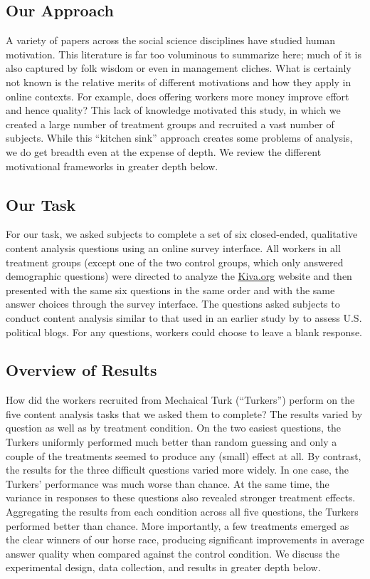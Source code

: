 \documentclass{chi2009}
\begin{document}
\subsection{Our Approach} 
A variety of papers across the social science disciplines have studied
human motivation. This literature is far too voluminous to summarize
here; much of it is also captured by folk wisdom or even in management
cliches. What is certainly not known is the relative merits of
different motivations and how they apply in online contexts. For
example, does offering workers more money improve effort and hence
quality? This lack of knowledge motivated this study, in which we
created a large number of treatment groups and recruited a vast number
of subjects. While this ``kitchen sink'' approach creates some
problems of analysis, we do get breadth even at the expense of
depth. We review the different motivational frameworks in greater
depth below.

\subsection{Our Task} 
For our task, we asked subjects to complete a set of six closed-ended,
qualitative content analysis questions using an online survey
interface. All workers in all treatment groups (except one of the two
control groups, which only answered demographic questions) were
directed to analyze the \href{http://www.kiva.org}{Kiva.org} website and then presented with the same
six questions in the same order and with the same answer choices
through the survey interface. The questions asked subjects to conduct
content analysis similar to that used in an earlier study by
\cite{benklershaw2010} to assess U.S. political blogs. For any
questions, workers could choose to leave a blank response.


\subsection{Overview of Results} 
How did the workers recruited from Mechaical Turk (``Turkers'') 
perform on the five content analysis tasks that we
asked them to complete? The results varied by question as well as by
treatment condition. On the two easiest questions, the Turkers
uniformly performed much better than random guessing and only a couple
of the treatments seemed to produce any (small) effect at all. By
contrast, the results for the three difficult questions varied more
widely. In one case, the Turkers' performance was much worse than
chance. At the same time, the variance in responses to these questions
also revealed stronger treatment effects. Aggregating the results from
each condition across all five questions, the Turkers performed better
than chance. More importantly, a few treatments emerged as the clear
winners of our horse race, producing significant improvements in
average answer quality when compared against the control condition. We
discuss the experimental design, data collection, and results in
greater depth below.
\end{document}
